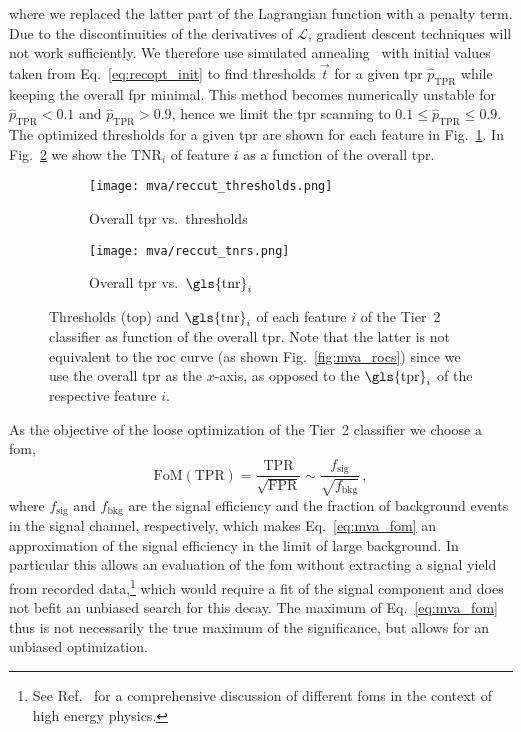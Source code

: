 where we replaced the latter part of the Lagrangian function with a penalty term.
Due to the discontinuities of the derivatives of $\mathcal{L}$, gradient descent techniques will not work sufficiently.
We therefore use simulated annealing~\cite{simannealing} with initial values taken from Eq.~\eqref{eq:recopt_init} to find thresholds $\vec t$ for a given \gls{tpr} $\hat p_\text{TPR}$ while keeping the overall \gls{fpr} minimal.
This method becomes numerically unstable for $\hat p_\text{TPR}<0.1$ and $\hat p_\text{TPR}>0.9$, hence we limit the \gls{tpr} scanning to $0.1 \le \hat p_\text{TPR} \le 0.9$.
The optimized thresholds for a given \gls{tpr} are shown for each feature in Fig.~\ref{fig:reccut_thresholds}.
In Fig.~\ref{fig:reccut_tnrs} we show the $\text{TNR}_i$ of feature $i$ as a function of the overall \gls{tpr}.
\begin{figure}[htbp]
    \centering
    \begin{subfigure}{\textwidth}
        \centering
        \texttt{[image: mva/reccut\_thresholds.png]}
        \caption{Overall \gls{tpr} vs.\ thresholds}
        \label{fig:reccut_thresholds}
    \end{subfigure}
    \par\bigskip 
    \begin{subfigure}{\textwidth}
        \centering
        \texttt{[image: mva/reccut\_tnrs.png]}
        \caption{Overall \gls{tpr} vs.\ $\text{\gls{tnr}}_i$}
        \label{fig:reccut_tnrs}
    \end{subfigure}
    \caption{Thresholds (top) and $\text{\gls{tnr}}_i$ of each feature $i$ of the Tier~2 classifier as function of the overall \gls{tpr}. Note that the latter is not equivalent to the \gls{roc} curve (as shown Fig.~\ref{fig:mva_rocs}) since we use the overall \gls{tpr} as the $x$-axis, as opposed to the $\text{\gls{tpr}}_i$ of the respective feature $i$.}
    \label{fig:mva_reccut_thresholds_tnrs}
\end{figure}

As the objective of the loose optimization of the Tier~2 classifier we choose a \gls{fom},
\begin{equation}
    \label{eq:mva_fom}
    \text{FoM}(\text{TPR}) = \frac{\text{TPR}}{\sqrt{\text{FPR}}} \sim \frac{f_\text{sig}}{\sqrt{f_\text{bkg}}} \,,
\end{equation}
where $f_\text{sig}$ and $f_\text{bkg}$ are the signal efficiency and the fraction of background events in the signal channel, respectively, which makes Eq.~\eqref{eq:mva_fom} an approximation of the signal efficiency in the limit of large background.
In particular this allows an evaluation of the \gls{fom} without extracting a signal yield from recorded data,\footnote{See Ref.~\cite{punzi} for a comprehensive discussion of different \glspl{fom} in the context of high energy physics.} which would require a fit of the signal component \decay{\Lb}{\Dz\Lz} and does not befit an unbiased search for this decay.
The maximum of Eq.~\eqref{eq:mva_fom} thus is not necessarily the true maximum of the significance, but allows for an unbiased optimization.

